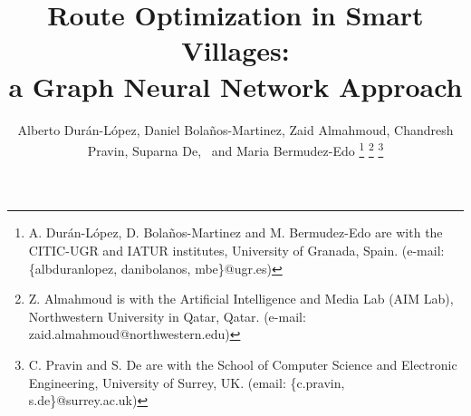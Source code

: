 \documentclass[journal]{IEEEtran}
\begin{document}
%
\title{Route Optimization in Smart Villages: \\ a Graph Neural Network Approach}
%
%
%

\author{Alberto Durán-López, Daniel Bolaños-Martinez, Zaid Almahmoud, Chandresh Pravin, Suparna De,~ and Maria Bermudez-Edo%
\thanks{A. Durán-López, D. Bolaños-Martinez and M. Bermudez-Edo are with the CITIC-UGR and IATUR institutes, University of Granada, Spain. (e-mail: \{albduranlopez, danibolanos, mbe\}@ugr.es)}%
\thanks{Z. Almahmoud is with the Artificial Intelligence and Media Lab (AIM Lab), Northwestern University in Qatar, Qatar. (e-mail: zaid.almahmoud@northwestern.edu)}%
\thanks{C. Pravin and S. De are with the School of Computer Science and Electronic Engineering, University of Surrey, UK. (email: \{c.pravin, s.de\}@surrey.ac.uk)}%
}

% 
%
\end{document}
